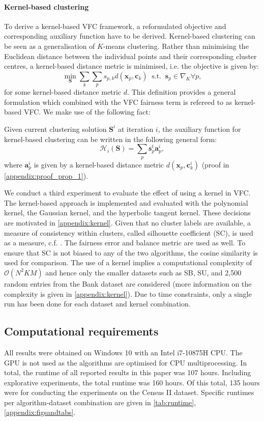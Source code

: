 \paragraph{Kernel-based clustering} \label{par:kbc} 
To derive a kernel-based VFC framework, a reformulated objective and corresponding auxiliary function have to be derived. Kernel-based clustering can be seen as a generalisation of $K$-means clustering. Rather than minimising the Euclidean distance between the individual points and their corresponding cluster centres, a kernel-based distance metric is minimised, i.e. the objective is given by:
\begin{equation}
\label{eq:KBC_objective}
    \min_{\mathbf{S}} \sum_k \sum_p s_{p, k} d(\textbf{x}_p, \textbf{c}_k) ~\text{ s.t. }~ \textbf{s}_p \in \nabla_K \forall p,
\end{equation}
for some kernel-based distance metric $d$. This definition provides a general formulation which combined with the VFC fairness term is refereed to as kernel-based VFC. We make use of the following fact:
\begin{prop}\label{prop:kernel}
Given current clustering solution $\mathbf{S}^i$ at iteration $i$, the auxiliary function for kernel-based clustering can be written in the following general form:
$$\mathcal{H}_i(\mathbf{S}) = \sum_p \textbf{s}_p^t  \textbf{a}_p^i,$$
where $\bm{a}_p^i$ is given by a kernel-based distance metric $d(\bm{x}_p, \bm{c}_k^i)$ (proof in \autoref{appendix:proof_prop_1}).
\end{prop}
We conduct a third experiment to evaluate the effect of using a kernel in VFC. The kernel-based approach is implemented and evaluated with the polynomial kernel, the Gaussian kernel, and the hyperbolic tangent kernel. These decisions are motivated in \autoref{appendix:kernel}.
Given that no cluster labels are available, a measure of consistency within clusters, called silhouette coefficient (SC), is used as a measure, c.f. \citep{dinh2019estimating}. The fairness error and balance metric are used as well. To ensure that SC is not biased to any of the two algorithms, the cosine similarity is used for comparison. The use of a kernel implies a computational complexity of $\mathcal{O}(N^2KM)$ and hence only the smaller datasets such as SB, SU, and 2,500 random entries from the Bank dataset are considered (more information on the complexity is given in \autoref{appendix:kernel}). Due to time constraints, only a single run has been done for each dataset and kernel combination. 

\subsection{Computational requirements}
All results were obtained on Windows 10 with an Intel i7-10875H CPU. The GPU is not used as the algorithms are optimised for CPU multiprocessing. In total, the runtime of all reported results in this paper was 107 hours. Including explorative experiments, the total runtime was 160 hours. Of this total, 135 hours were for conducting the experiments on the Census II dataset. Specific runtimes per algorithm-dataset combination are given in \autoref{tab:runtime}, \autoref{appendix:figsandtabs}.


